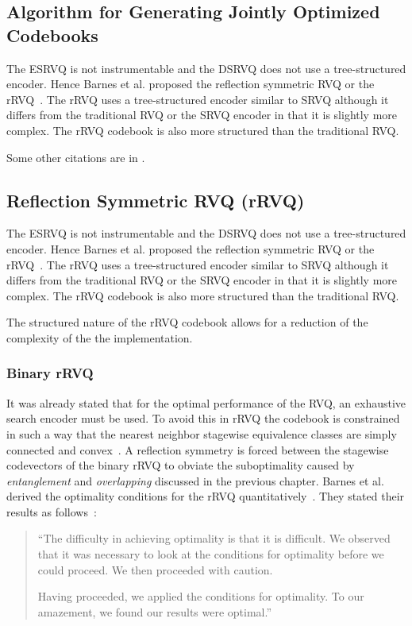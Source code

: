 \subsection{Algorithm for Generating Jointly Optimized
Codebooks}


The ESRVQ is not instrumentable and the DSRVQ does not use a
tree-structured encoder.  Hence Barnes et al. proposed the reflection
symmetric RVQ or the rRVQ~\cite{Barn-JORVQ}.  The rRVQ uses a
tree-structured encoder similar to SRVQ although it differs from the
traditional RVQ or the SRVQ encoder in that it is slightly more
complex.  The rRVQ codebook is also more structured than the
traditional RVQ.

Some other citations are in
\cite{moon,BAK-nonadVQ,B-JORVQ,Barnes-RQ,Datasheet1,CID-example,Privatecom,Patent1,Berg-RD,CMH}.

\subsection{Reflection Symmetric RVQ (rRVQ)}

The ESRVQ is not instrumentable and the DSRVQ does not use a
tree-structured encoder.  Hence Barnes et al. proposed the reflection
symmetric RVQ or the rRVQ~\cite{Barn-JORVQ}.  The rRVQ uses a
tree-structured encoder similar to SRVQ although it differs from the
traditional RVQ or the SRVQ encoder in that it is slightly more
complex.  The rRVQ codebook is also more structured than the
traditional RVQ.

The structured nature of the rRVQ codebook allows for a reduction of
the complexity of the the implementation.

\subsubsection{Binary rRVQ}

It was already stated that for the optimal performance of the RVQ, an
exhaustive search encoder must be used. To avoid this in rRVQ the
codebook is constrained in such a way that the nearest neighbor
stagewise equivalence classes are simply connected and
convex~\cite{Barn-JORVQ}.  A reflection symmetry is forced between the
stagewise codevectors of the binary rRVQ to obviate the suboptimality
caused by {\em entanglement} and {\em overlapping} discussed in the
previous chapter.  Barnes et al. derived the optimality conditions
for the rRVQ quantitatively~\cite{Barn-JORVQ}.  They stated their
results as follows~\cite[pp. 3--4]{Barn-JORVQ}:
\begin{quotation}
\begin{spacing}{1}
  ``The difficulty in achieving optimality is that it is difficult.  We
  observed that it was necessary to look at the conditions for
  optimality before we could proceed.  We then proceeded with caution.

  Having proceeded, we applied the conditions for optimality.  To our
  amazement, we found our results were optimal.''
\end{spacing}
\end{quotation}


